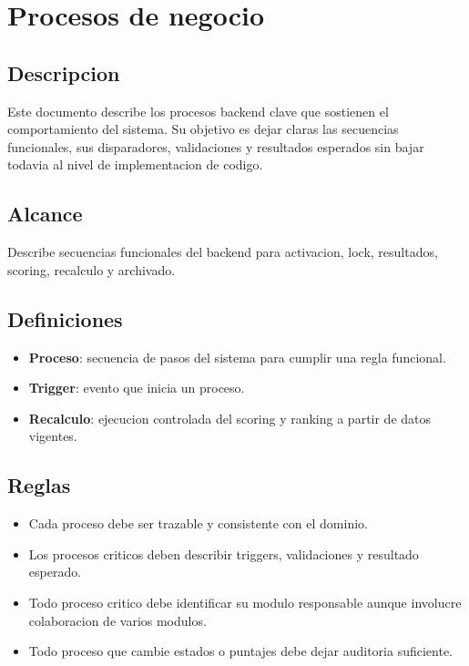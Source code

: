 \section{Procesos de negocio}

\subsection{Descripcion}

Este documento describe los procesos backend clave que sostienen el comportamiento del sistema. Su objetivo es dejar claras las secuencias funcionales, sus disparadores, validaciones y resultados esperados sin bajar todavia al nivel de implementacion de codigo.

\subsection{Alcance}

Describe secuencias funcionales del backend para activacion, lock, resultados, scoring, recalculo y archivado.

\subsection{Definiciones}

\begin{itemize}
  \item \textbf{Proceso}: secuencia de pasos del sistema para cumplir una regla funcional.
  \item \textbf{Trigger}: evento que inicia un proceso.
  \item \textbf{Recalculo}: ejecucion controlada del scoring y ranking a partir de datos vigentes.
\end{itemize}

\subsection{Reglas}

\begin{itemize}
  \item Cada proceso debe ser trazable y consistente con el dominio.
  \item Los procesos criticos deben describir triggers, validaciones y resultado esperado.
  \item Todo proceso critico debe identificar su modulo responsable aunque involucre colaboracion de varios modulos.
  \item Todo proceso que cambie estados o puntajes debe dejar auditoria suficiente.
\end{itemize}

